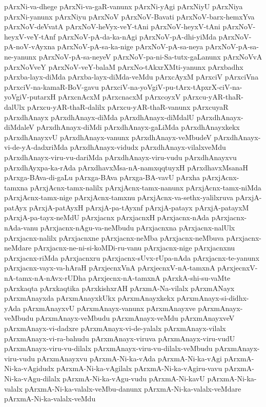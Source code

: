 {pArxNi-va-dhege
pArxNi-va-gaR-vanunx
pArxNi-yAgi
pArxNiyU
pArxNiya
pArxNi-yanunx
pArxNiyu
pArxNoV
pArxNoV-Bavati
pArxNoV-barx-hemxYva
pArxNoV-deVvatA
pArxNoV-heVyx-veY-tAni
pArxNoV-heyxV-tAni
pArxNoV-heyxV-veY-tAnf
pArxNoV-pA-da-ka-nAgi
pArxNoV-pA-dhi-yiMda
pArxNoV-pA-noV-vAyxna
pArxNoV-pA-sa-ka-nige
pArxNoV-pA-sa-neya
pArxNoV-pA-sa-ne-yanunx
pArxNoV-pA-sa-neyeV
pArxNoV-pa-ni-Sa-tutx-gaLanunx
pArxNoVvA
pArxNoVveY
pArxNoV-veY-balaM
pArxNo-tAkxrXMti-yanunx
pArxbadhx
pArxba-layx-diMda
pArxba-layx-diMda-veMdu
pArxcAyxM
pArxciV
pArxciVna
pArxciV-na-kamaR-BoV-gavu
pArxciV-na-yoVgiV-pu-tArx-tApxrX-ciV-na-yoVgiV-putarxH
pArxcnAcxM
pArxcnacxM
pArxcoyxV
pArxcu-yAR-thaR-dalUlx
pArxcu-yAR-thaR-dalilx
pArxcu-yAR-thaR-vanunx
pArxcuyaR
pArxdhAnayx
pArxdhAnayx-diMda
pArxdhAnayx-diMdalU
pArxdhAnayx-diMdaleV
pArxdhAnayx-diMdi
pArxdhAnayx-gaLiMda
pArxdhAnayxkekx
pArxdhAnayxvU
pArxdhAnayx-vanunx
pArxdhAnayx-veMbudeV
pArxdhAnayx-vi-de-yA-dadxriMda
pArxdhAnayx-vidudx
pArxdhAnayx-vilalxveMdu
pArxdhAnayx-viru-vu-dariMda
pArxdhAnayx-viru-vudu
pArxdhAnayxvu
pArxdhAyxpa-ka-rAda
pArxdhavxMsa-nA-namxqqtuyxH
pArxdhavxMsanaH
pArxga-BAva-di-gaLu
pArxga-BAva
pArxga-BA-vavU
pArxha
pArxjAcnx-tamxna
pArxjAcnx-tamx-nalilx
pArxjAcnx-tamx-nanunx
pArxjAcnx-tamx-niMda
pArxjAcnx-tamx-nige
pArxjAcnx-tamxnu
pArxjAcnx-va-sethx-yalilxruva
pArxjA-patAyx
pArxjA-patAyxH
pArxjA-pa-tAyxnf
pArxjA-patayx
pArxjA-patayxM
pArxjA-pa-tayx-neMdU
pArxjacnx
pArxjacnxH
pArxjacnx-nAda
pArxjacnx-nAda-vanu
pArxjacnx-nAgu-va-neMbudu
pArxjacnxna
pArxjacnx-nalUlx
pArxjacnx-nalilx
pArxjacnxne
pArxjacnx-neMba
pArxjacnx-neMbuva
pArxjacnx-neMdare
pArxjacnx-ne-ni-si-koMDi-ru-vanu
pArxjacnx-nige
pArxjacnxnu
pArxjacnx-riMda
pArxjacnxru
pArxjacnx-sUvx-rUpa-nAda
pArxjacnx-te-yanunx
pArxjacnx-vayx-va-hAraH
pArxjecnxVnA
pArxjecnxV-nA-tamxnA
pArxjecnxV-nA-tamx-nA-nAvx-rUDha
pArxjecnx-nA-tamxnA
pArxkA-shi-su-vaMte
pArxkaqta
pArxkaqtika
pArxkishxrAH
pArxmA-Na-vilalx
pArxmANayx
pArxmAnayxda
pArxmAnayxkUkx
pArxmAnayxkekx
pArxmAnayx-si-didhx-yAda
pArxmAnayxvU
pArxmAnayx-vanunx
pArxmAnayxve
pArxmAnayx-veMbudu
pArxmAnayx-veMbudu
pArxmAnayx-veMdu
pArxmAnayxveV
pArxmAnayx-vi-dadxre
pArxmAnayx-vi-de-yalalx
pArxmAnayx-vilalx
pArxmAnayx-vi-ra-bahudu
pArxmAnayx-viruva
pArxmAnayx-viru-vudU
pArxmAnayx-viru-vu-dilalx
pArxmAnayx-viru-vu-dilalx-veMbudu
pArxmAnayx-viru-vudu
pArxmAnayxvu
pArxmA-Ni-ka-vAda
pArxmA-Ni-ka-vAgi
pArxmA-Ni-ka-vAgidudx
pArxmA-Ni-ka-vAgilalx
pArxmA-Ni-ka-vAgiru-vavu
pArxmA-Ni-ka-vAgu-dilalx
pArxmA-Ni-ka-vAgu-vudu
pArxmA-Ni-kavU
pArxmA-Ni-ka-valalx
pArxmA-Ni-ka-valalx-veMbu-danunx
pArxmA-Ni-ka-valalx-veMdare
pArxmA-Ni-ka-valalx-veMdu
}
